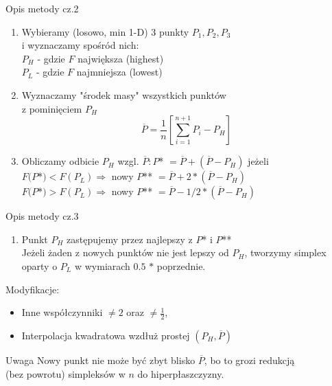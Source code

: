   \begin{frame}{Opis metody cz.2}

	\begin{enumerate}
		\item Wybieramy (losowo, min 1-D) 3 punkty $P_1,P_2,P_3$
		\\i wyznaczamy spośród nich:
		\\ $P_H$ - gdzie $F$ największa (highest)
		\\ $P_L$ - gdzie $F$ najmniejsza (lowest)
		\item Wyznaczamy "środek masy" wszystkich punktów
		\\z pominięciem $P_H$
		  \begin{displaymath}
		    \overline{P}=\frac{1}{n}\left[\sum_{i=1}^{n+1}P_i-P_H\right]
		  \end{displaymath}
		\item Obliczamy odbicie $P_H$ wzgl. $\overline{P} : P$* $= \overline{P}+(\overline{P}-P_H)$ jeżeli
		\\ $F(P$*$) < F(P_L) \Rightarrow$ nowy $P$** $= \overline{P}+2*(\overline{P}-P_H)$
		\\ $F(P$*$) > F(P_L) \Rightarrow$ nowy $P$** $= \overline{P}-1/2*(\overline{P}-P_H)$
		\setcounter{saveenumi}{\value{enumi}}
	\end{enumerate}

  \end{frame}

  \begin{frame}{Opis metody cz.3}

	\begin{enumerate}
		\setcounter{enumi}{\value{saveenumi}}
		\item Punkt $P_H$ zastępujemy przez najlepszy z $P$* i $P$**
		\smallskip
		\\Jeżeli żaden z nowych punktów nie jest lepszy od $P_H$, tworzymy simplex oparty o $P_L$ w wymiarach $0.5$ $*$ poprzednie.
	\end{enumerate}
	Modyfikacje:
	\begin{itemize}
		\item Inne współczynniki $\neq 2$ oraz $\neq \frac{1}{2}$,
		\item Interpolacja kwadratowa wzdłuż prostej $(P_H,\overline{P})$
	\end{itemize}
    \begin{alertblock}{Uwaga}
 	  	Nowy punkt nie może być zbyt blisko $\overline{P}$, bo to grozi redukcją\\ (bez powrotu) simpleksów w $n$ do hiperpłaszczyzny.
    \end{alertblock}
  \end{frame}

